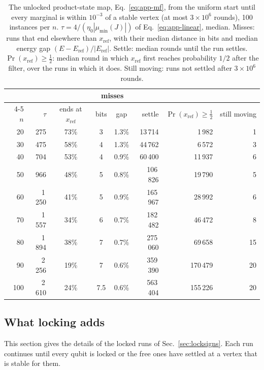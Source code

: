 \begin{table}[ht]
\centering
\small
\caption{The unlocked product-state map, Eq.~\eqref{eq:app-mf}, from the uniform start until every marginal is within $10^{-3}$ of a stable vertex (at most $3\times10^6$ rounds), 100 instances per $n$. $\tau=4/(\eta_0|\mu_{\min}(J)|)$ of Eq.~\eqref{eq:app-linear}, median. Misses: runs that end elsewhere than $x_{\mathrm{ref}}$, with their median distance in bits and median energy gap $(E-E_{\mathrm{ref}})/|E_{\mathrm{ref}}|$. Settle: median rounds until the run settles. $\Pr(x_{\mathrm{ref}})\ge\frac12$: median round in which $x_{\mathrm{ref}}$ first reaches probability $1/2$ after the filter, over the runs in which it does. Still moving: runs not settled after $3\times10^6$ rounds.}
\label{tab:app-flow}
\begin{tabular}{rrcccrrr}
\toprule
 & & & \multicolumn{2}{c}{misses} & & & \\
\cmidrule(lr){4-5}
$n$ & $\tau$ & ends at $x_{\mathrm{ref}}$ & bits & gap & settle & $\Pr(x_{\mathrm{ref}})\ge\frac12$ & still moving \\
\midrule
20 & 275 & 73\% & 3 & 1.3\% & 13\,714 & 1\,982 & 1 \\
30 & 475 & 58\% & 4 & 1.3\% & 44\,762 & 6\,572 & 3 \\
40 & 704 & 53\% & 4 & 0.9\% & 60\,400 & 11\,937 & 6 \\
50 & 966 & 48\% & 5 & 0.8\% & 106\,826 & 19\,790 & 5 \\
60 & 1\,250 & 41\% & 5 & 0.9\% & 165\,967 & 28\,992 & 6 \\
70 & 1\,557 & 34\% & 6 & 0.7\% & 182\,482 & 46\,472 & 8 \\
80 & 1\,894 & 38\% & 7 & 0.7\% & 275\,060 & 69\,658 & 15 \\
90 & 2\,256 & 19\% & 7 & 0.6\% & 359\,390 & 170\,479 & 20 \\
100 & 2\,610 & 24\% & 7.5 & 0.6\% & 563\,404 & 155\,226 & 20 \\
\bottomrule
\end{tabular}
\end{table}


\subsection{What locking adds}
\label{app:lockflow}
This section gives the details of the locked runs of Sec.~\ref{sec:locksigns}. Each run continues until every qubit is locked or the free ones have settled at a vertex that is stable for them.

